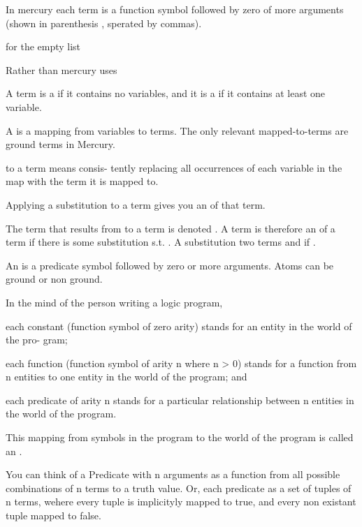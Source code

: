 \begin{compactitem} 
\item In mercury each term is a function symbol followed by zero of more arguments (shown in parenthesis , sperated by commas). 
\item \e{[]} for the empty list
\item Rather than  mercury uses \e{$[X|XS]$}
\item A term is a  if it contains no variables,
and it is a  if it contains at least
one variable.
\item A  is a mapping from variables to terms. The only relevant mapped-to-terms are ground terms in Mercury.
\item {} to a term means consis-
tently replacing all occurrences of each variable in
the map with the term it is mapped to.
\item Applying a substitution to a term gives you an  of that term.
\item The term that results from 
\e{$\theta$} to a term  is denoted . A term  is therefore an  of a term  if there is some substitution \e{$\theta$} s.t. . A substitution \e{$\theta$}  two terms  and  if .
\item An  is a predicate symbol followed by zero or more arguments. Atoms can be ground or non ground. 
\item In the mind of the person writing a logic program,
\begin{compactitem}
\item each constant (function symbol of zero arity)
stands for an entity in the world of the pro-
gram;
\item each function (function symbol of arity n where
n > 0) stands for a function from n entities to
one entity in the world of the program; and
\item each predicate of arity n stands for a particular
relationship between n entities in the world of
the program.
\end{compactitem} This mapping from symbols in the program to the world of the program is called an . 
\item You can think of a Predicate with n arguments as a function from all possible combinations of n terms to a truth value. Or, each predicate as a set of tuples of n terms, wehere every tuple is implicityly mapped to true, and every non existant tuple mapped to false. 

\end{compactitem}
